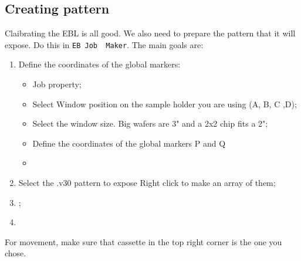  \subsection{Creating pattern\label{subsec:jobMaker}}
 Claibrating  the EBL  is  all good.   We also  need  to prepare  the
 pattern that  it will expose. Do  this in \verb|EB Job  Maker|.  The
 main goals are:
 \begin{enumerate}
 \item Define the coordinates of the global markers:
   \begin{itemize}
   \item {Job property};
   \item Select  Window position on  the sample holder you  are using
     (A, B, C ,D);
   \item Select  the window size.  Big  wafers are 3" and  a 2x2 chip
     fits a 2";
   \item  Define  the coordinates  of  the  global  markers P  and  Q
   \item {}
   \end{itemize}
 \item Select the .v30 pattern to  expose \ira Right click to make an
   array of them;
 \item {} \ira {};
 \item {}
 \end{enumerate}


 \begin{framed}\noindent
   For movement, make sure that {cassette} in the top right corner is
   the one you chose.
 \end{framed}
 \newpage
